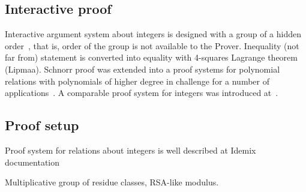 \documentclass{article}
\begin{document}
\subsection{Interactive proof}

Interactive argument system about integers is designed
with a group of a hidden order~\cite{},
that is, order of the group is not available to the Prover.
Inequality (not far from) statement is converted into equality
with 4-squares Lagrange theorem (Lipmaa).
Schnorr proof was extended into a proof systems for polynomial relations
with polynomials of higher degree in challenge
for a number of applications~\cite{F363,CF12}.
A comparable proof system for integers was introduced at~\cite{F10}.

\subsection{Proof setup}

Proof system for relations about integers is well described at Idemix documentation~\cite{Indemix}

Multiplicative group of residue classes, RSA-like modulus.
\end{document}
